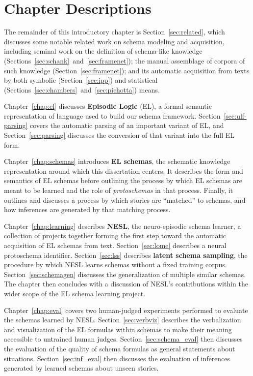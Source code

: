 \section{Chapter Descriptions}
The remainder of this introductory chapter is Section~\ref{sec:related}, which discusses some notable related work on schema modeling and acquisition, including seminal work on the definition of schema-like knowledge (Sections~\ref{sec:schank}~and~\ref{sec:framenet}); the manual assemblage of corpora of such knowledge (Section~\ref{sec:framenet}); and its automatic acquisition from texts by both symbolic (Section~\ref{sec:ipp}) and statistical (Sections~\ref{sec:chambers}~and~\ref{sec:pichotta}) means.

Chapter~\ref{chap:el} discusses \textbf{Episodic Logic} (EL), a formal semantic representation of language used to build our schema framework. Section~\ref{sec:ulf-parsing} covers the automatic parsing of an important variant of EL, and Section~\ref{sec:parsing} discusses the conversion of that variant into the full EL form.

Chapter~\ref{chap:schemas} introduces \textbf{EL schemas}, the schematic knowledge representation around which this dissertation centers. It describes the form and semantics of EL schemas before outlining the process by which EL schemas are meant to be learned and the role of \textit{protoschemas} in that process. Finally, it outlines and discusses a process by which stories are ``matched'' to schemas, and how inferences are generated by that matching process.

Chapter~\ref{chap:learning} describes \textbf{NESL}, the neuro-episodic schema learner, a collection of projects together forming the first step toward the automatic acquisition of EL schemas from text. Section~\ref{sec:lome} describes a neural protoschema identifier. Section~\ref{sec:lss} describes \textbf{latent schema sampling}, the procedure by which NESL learns schemas without a fixed training corpus. Section~\ref{sec:schemagen} discusses the generalization of multiple similar schemas. The chapter then concludes with a discussion of NESL's contributions within the wider scope of the EL schema learning project.

Chapter~\ref{chap:eval} covers two human-judged experiments performed to evaluate the schemas learned by NESL. Section~\ref{sec:verbviz} describes the verbalization and visualization of the EL formulas within schemas to make their meaning accessible to untrained human judges. Section~\ref{sec:schema_eval} then discusses the evaluation of the quality of schema formulas as general statements about situations. Section~\ref{sec:inf_eval} then discusses the evaluation of inferences generated by learned schemas about unseen stories.